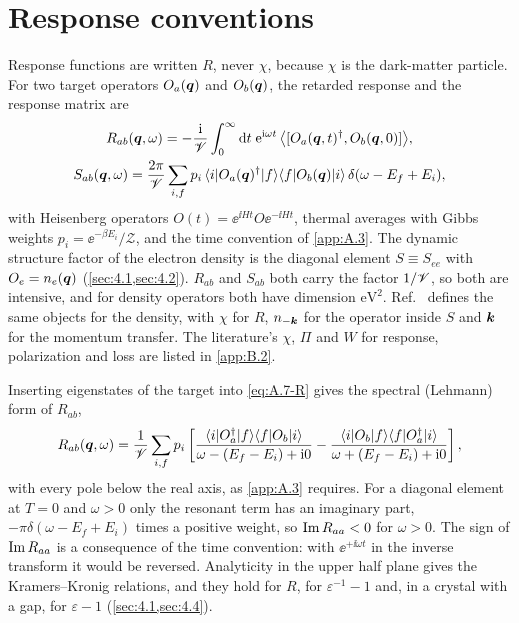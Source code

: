 \section{Response conventions}\label{app:A.7}

Response functions are written $R$, never $\chi$, because $\chi$ is the dark-matter particle. For two target operators $O_a(\bm{q})$ and $O_b(\bm{q})$, the retarded response and the response matrix are
\begin{gather}
  R_{ab}(\bm{q},\omega) = -\frac{\mathrm{i}}{\mathscr{V}}\int_0^\infty\mathrm{d} t\;\mathrm{e}^{\mathrm{i}\omega t}\,\bigl\langle[O_a(\bm{q},t)^\dagger, O_b(\bm{q},0)]\bigr\rangle,
  \label{eq:A.7-R}\\
  S_{ab}(\bm{q},\omega) = \frac{2\pi}{\mathscr{V}}\sum_{i,f}p_i\,\langle i|O_a(\bm{q})^\dagger|f\rangle\langle f|O_b(\bm{q})|i\rangle\,\delta(\omega - E_f + E_i),
  \label{eq:A.7-S}
\end{gather}
with Heisenberg operators $O(t) = \ee^{\ii Ht}O\ee^{-\ii Ht}$, thermal averages with Gibbs weights $p_i = \ee^{-\beta E_i}/\mathcal{Z}$, and the time convention of \cref{app:A.3}. The dynamic structure factor of the electron density is the diagonal element $S \equiv S_{ee}$ with $O_e = n_e(\bm{q})$ (\cref{sec:4.1,sec:4.2}). $R_{ab}$ and $S_{ab}$ both carry the factor $1/\mathscr{V}$, so both are intensive, and for density operators both have dimension $\mathrm{eV}^2$. Ref.~\cite[Eqs.~(2) and (4)]{knapen2021dark} defines the same objects for the density, with $\chi$ for $R$, $n_{-\bm{k}}$ for the operator inside $S$ and $\bm{k}$ for the momentum transfer. The literature's $\chi$, $\Pi$ and $W$ for response, polarization and loss are listed in \cref{app:B.2}.

Inserting eigenstates of the target into \cref{eq:A.7-R} gives the spectral (Lehmann) form of $R_{ab}$,
\begin{equation}
  R_{ab}(\bm{q},\omega) = \frac{1}{\mathscr{V}}\sum_{i,f}p_i\left[\frac{\langle i|O_a^\dagger|f\rangle\langle f|O_b|i\rangle}{\omega - (E_f - E_i) + \mathrm{i} 0} - \frac{\langle i|O_b|f\rangle\langle f|O_a^\dagger|i\rangle}{\omega + (E_f - E_i) + \mathrm{i} 0}\right],
  \label{eq:A.7-lehmann}
\end{equation}
with every pole below the real axis, as \cref{app:A.3} requires. For a diagonal element at $T = 0$ and $\omega > 0$ only the resonant term has an imaginary part, $-\pi\delta(\omega - E_f + E_i)$ times a positive weight, so $\operatorname{Im} R_{aa} < 0$ for $\omega > 0$. The sign of $\operatorname{Im} R_{aa}$ is a consequence of the time convention: with $\ee^{+\ii\omega t}$ in the inverse transform it would be reversed. Analyticity in the upper half plane gives the Kramers--Kronig relations, and they hold for $R$, for $\varepsilon^{-1} - 1$ and, in a crystal with a gap, for $\varepsilon - 1$ (\cref{sec:4.1,sec:4.4}).

